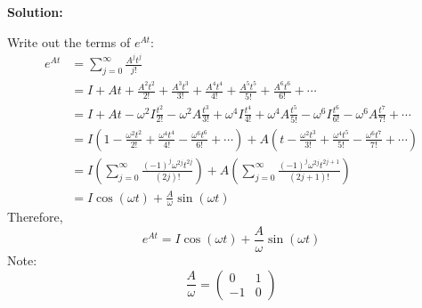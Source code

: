 \documentclass[12pt]{article}
\newenvironment{solution}{
    \textbf{Solution:}
    
}{
    
    \vspace{2em}
}
\begin{document}
\begin{solution}
    Write out the terms of \(e^{At}\):
    \[
        \begin{aligned}
            e^{At} &= \sum_{j=0}^{\infty} \frac{A^j t^j}{j!} \\
            &= I + At + \frac{A^2 t^2}{2!} + \frac{A^3 t^3}{3!} + \frac{A^4 t^4}{4!} + \frac{A^5 t^5}{5!} + \frac{A^6 t^6}{6!} + \cdots\\
            &= I + At - \omega^2 I \frac{t^2}{2!} - \omega^2 A \frac{t^3}{3!} + \omega^4 I \frac{t^4}{4!} + \omega^4 A \frac{t^5}{5!} - \omega^6 I \frac{t^6}{6!} - \omega^6 A \frac{t^7}{7!} + \cdots\\
            &= I \left(1 - \frac{\omega^2 t^2}{2!} + \frac{\omega^4 t^4}{4!} - \frac{\omega^6 t^6}{6!} + \cdots \right) + A \left(t - \frac{\omega^2 t^3}{3!} + \frac{\omega^4 t^5}{5!} - \frac{\omega^6 t^7}{7!} + \cdots \right) \\
            &= I \left(\sum_{j=0}^{\infty} \frac{(-1)^j \omega^{2j} t^{2j}}{(2j)!} \right) + A \left(\sum_{j=0}^{\infty} \frac{(-1)^j \omega^{2j} t^{2j+1}}{(2j+1)!} \right)\\
            &= I \cos(\omega t) + \frac{A}{\omega} \sin(\omega t)
        \end{aligned}
    \]
    Therefore,
    \[
        e^{At} = I \cos(\omega t) + \frac{A}{\omega} \sin(\omega t)
    \]
    Note:
    \[
        \frac{A}{\omega} = \begin{pmatrix} 0 & 1 \\ -1 & 0 \end{pmatrix}
    \]


\end{solution}
\end{document}
